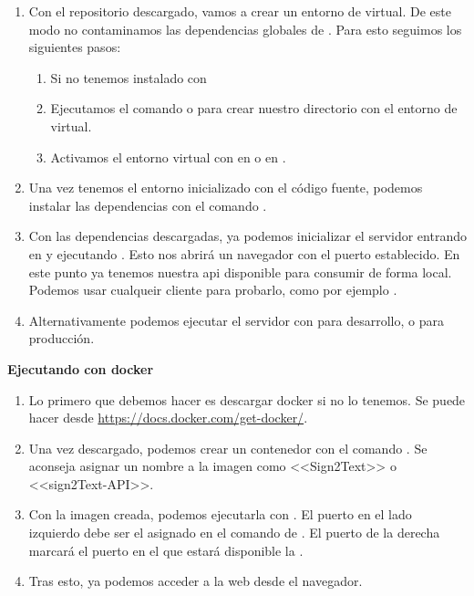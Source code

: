 \begin{enumerate}
  \item Con el repositorio descargado, vamos a crear un entorno de  virtual. De este modo no contaminamos las dependencias globales de . Para esto seguimos los siguientes pasos:
        \begin{enumerate}
          \item Si no tenemos instalado con 
          \item Ejecutamos el comando  o  para crear nuestro directorio  con el entorno de  virtual.
          \item Activamos el entorno virtual con  en  o  en .
        \end{enumerate}

  \item Una vez tenemos el entorno inicializado con el código fuente, podemos instalar las dependencias con el comando .

  \item Con las dependencias descargadas, ya podemos inicializar el servidor entrando en  y ejecutando . Esto nos abrirá un navegador con el puerto establecido. En este punto ya tenemos nuestra api disponible para consumir de forma local. Podemos usar cualqueir cliente para probarlo, como por ejemplo .

  \item Alternativamente podemos ejecutar el servidor con  para desarrollo, o  para producción.
\end{enumerate}

\textbf{Ejecutando con docker}

\begin{enumerate}
  \item Lo primero que debemos hacer es descargar docker si no lo tenemos. Se puede hacer desde \url{https://docs.docker.com/get-docker/}.

  \item Una vez descargado, podemos crear un contenedor con el comando . Se aconseja asignar un nombre a la imagen como <<Sign2Text>> o <<sign2Text-API>>.

  \item Con la imagen creada, podemos ejecutarla con . El puerto en el lado izquierdo debe ser el asignado en el comando de . El puerto de la derecha marcará el puerto en el que estará disponible la .

  \item Tras esto, ya podemos acceder a la web desde el navegador.
\end{enumerate}

